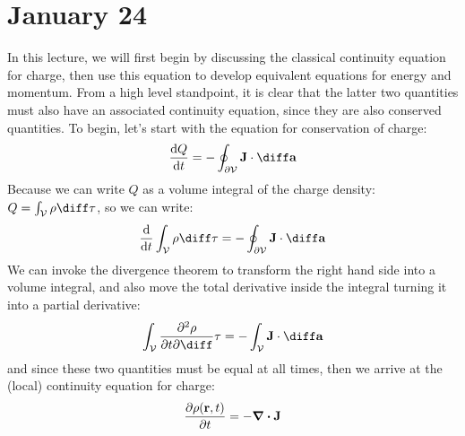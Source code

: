 \section{January 24}
In this lecture, we will first begin by discussing the classical continuity equation for charge, then use
this equation to develop equivalent equations for energy and momentum. From a high level standpoint, it is
clear that the latter two quantities must also have an associated continuity equation, since they are also
conserved quantities. To begin, let's start with the equation for conservation of charge:
\begin{equation}
	\label{cons-charge}
	\dv{Q}{t} = - \oint_{\partial \mathcal{V}} \mathbf{J} \cdot \diff \mathbf{a} 
\end{equation}
Because we can write \( Q \) as a volume integral of the charge density: \( Q = \int_{\mathcal{ V}}\rho \diff
\tau\), so we can write:
\[
	\dv{t} \int_{\mathcal{ V}} \rho \diff \tau = -\oint_{\partial \mathcal{ V}} \mathbf{J} \cdot \diff \mathbf{a}
\]
We can invoke the divergence theorem to transform the right hand side into a volume integral, and also move
the total derivative inside the integral turning it into a partial derivative:
\[
	\int_{\mathcal{V}} \pdv{\rho}{t}\diff \tau = -\int_{\mathcal{V}}\mathbf{J} \cdot \diff \mathbf{a}
\]
and since these two quantities must be equal at all times, then we arrive at the (local) 
continuity equation for charge:
\begin{equation}
	\label{charge continuity}
	\pdv{\rho(\mathbf{r}, t)}{t} = - \div \mathbf{J}
\end{equation}

